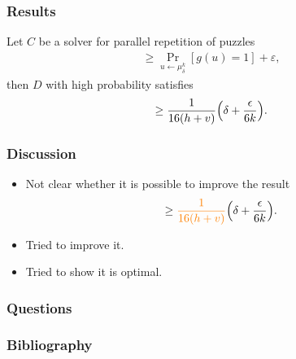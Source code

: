 \documentclass[first,firstsupp,handout,last]{ETHclass}
\begin{document}
\begin{frame} [t]
  \frametitle{Results}
      Let $C$ be a solver for parallel repetition of puzzles \\
      \begin{align*}
        \geq \underset{u \leftarrow \mu_\delta^k}{\Pr}[g(u) = 1] + \varepsilon,
      \end{align*}
      then $D$ with high probability satisfies
      \begin{align*}
         \geq \frac{1}{16(h+v)} \Bigl(\delta + \frac{\epsilon}{6k}\Bigr).
      \end{align*}
\end{frame}

\begin{frame}[t]
  \frametitle{Discussion}
  \begin{itemize}
    \item Not clear whether it is possible to improve the result
      \begin{align*}
         \geq \textcolor{orange}{\frac{1}{16(h+v)}} \Bigl(\delta + \frac{\epsilon}{6k}\Bigr).
      \end{align*}
    \item Tried to improve it. \textcolor{orange}{\xmark}
    \item Tried to show it is optimal. \textcolor{orange}{\xmark}
  \end{itemize}
\end{frame}

\begin{frame}
\frametitle{Questions}
\end{frame}


\begin{frame}[t]
\frametitle{Bibliography}


\end{frame}
\end{document}
